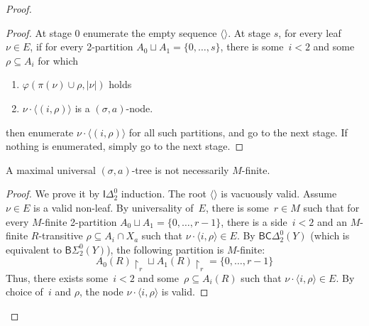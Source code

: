 \documentclass{article}
\numberwithin{theorem}{section}
\newtheorem{lemma}[theorem]{Lemma}
\newcommand{\quentin}[1]{\textcolor{green}{#1}}
\newcommand{\BSig}{\mathsf{B}\Sigma^0}
\newcommand{\IDel}{\mathsf{I}\Delta^0}
\newcommand{\BCDe}{\mathsf{BC}\Delta^0}
\newcommand{\M}{\mathcal{M}}
\newcommand{\uh}[0]{{\upharpoonright}}
\begin{document}
\begin{proof}
\begin{proof}
At stage $0$ enumerate the empty sequence $\langle \rangle$.
At stage $s$, for every leaf $\nu \in E$, if for every 2-partition $A_0 \sqcup A_1 = \{0,\dots,s\}$, there is some~$i < 2$ and some~$\rho \subseteq A_i$ for which 
\begin{enumerate}
    \item[(i)] $\varphi(\pi(\nu) \cup \rho, |\nu|)$ holds
    \item[(ii)] $\nu \cdot \langle (i, \rho) \rangle$ is a $(\sigma, a)$-node.
\end{enumerate}
then enumerate $\nu \cdot \langle (i, \rho) \rangle$ for all such partitions, and go to the next stage.
If nothing is enumerated, simply go to the next stage.
\end{proof}

A maximal universal $(\sigma, a)$-tree is not necessarily $M$-finite.

\begin{proof}
We prove it by $\IDel_2$ induction. 
The root $\langle \rangle$ is vacuously valid. Assume  $\nu \in E$ is a valid non-leaf.
By universality of~$E$, there is some~$r \in M$ such that for every $M$-finite 2-partition $A_0 \sqcup A_1 = \{0, \dots, r-1\}$, there is a side~$i < 2$ and an $M$-finite $R$-transitive $\rho \subseteq A_i \cap X_a$ such that $\nu \cdot \langle i, \rho \rangle \in E$. By $\BCDe_2(Y)$ (which is equivalent to $\BSig_2(Y)$), the following partition is $M$-finite:
$$A_0(R) \uh_r \sqcup A_1(R) \uh_r = \{0,\dots, r-1\}$$
Thus, there exists some~$i < 2$ and some~$\rho \subseteq A_i(R)$ such that $\nu \cdot \langle i, \rho \rangle \in E$. By choice of~$i$ and $\rho$, the node $\nu \cdot \langle i, \rho \rangle$ is valid.
\end{proof}




\end{proof}
\end{document}
